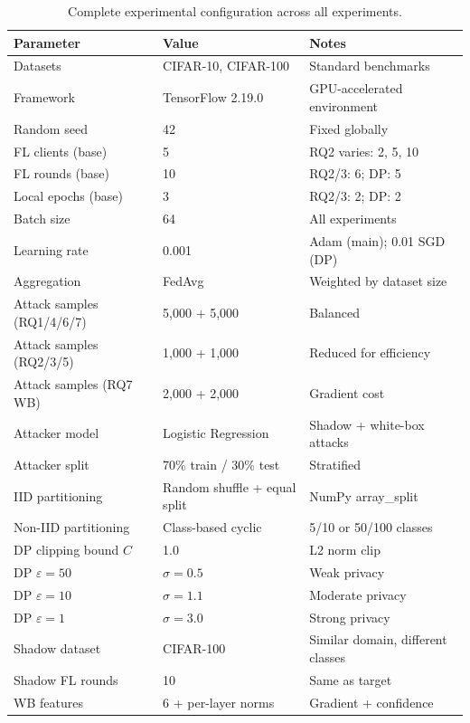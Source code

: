 \documentclass[12pt, a4paper]{report}
\begin{document}
\begin{table}[H]
  \centering
  \caption{Complete experimental configuration across all experiments.}
  \label{tab:config}
  \begin{tabular}{llp{5cm}}
    \toprule
    \textbf{Parameter} & \textbf{Value} & \textbf{Notes} \\
    \midrule
    Datasets                  & CIFAR-10, CIFAR-100   & Standard benchmarks \\
    Framework                 & TensorFlow 2.19.0     & GPU-accelerated environment \\
    Random seed               & 42                    & Fixed globally \\
    FL clients (base)         & 5                     & RQ2 varies: 2, 5, 10 \\
    FL rounds (base)          & 10                    & RQ2/3: 6; DP: 5 \\
    Local epochs (base)       & 3                     & RQ2/3: 2; DP: 2 \\
    Batch size                & 64                    & All experiments \\
    Learning rate             & 0.001                 & Adam (main); 0.01 SGD (DP) \\
    Aggregation               & FedAvg                & Weighted by dataset size \\
    Attack samples (RQ1/4/6/7) & 5,000 + 5,000        & Balanced \\
    Attack samples (RQ2/3/5)  & 1,000 + 1,000         & Reduced for efficiency \\
    Attack samples (RQ7 WB)   & 2,000 + 2,000         & Gradient cost \\
    Attacker model            & Logistic Regression   & Shadow + white-box attacks \\
    Attacker split            & 70\% train / 30\% test & Stratified \\
    IID partitioning          & Random shuffle + equal split & NumPy array\_split \\
    Non-IID partitioning      & Class-based cyclic    & 5/10 or 50/100 classes \\
    DP clipping bound $C$     & 1.0                   & L2 norm clip \\
    DP $\varepsilon=50$       & $\sigma = 0.5$        & Weak privacy \\
    DP $\varepsilon=10$       & $\sigma = 1.1$        & Moderate privacy \\
    DP $\varepsilon=1$        & $\sigma = 3.0$        & Strong privacy \\
    Shadow dataset            & CIFAR-100             & Similar domain, different classes \\
    Shadow FL rounds          & 10                    & Same as target \\
    WB features               & 6 + per-layer norms   & Gradient + confidence \\
    \bottomrule
  \end{tabular}
\end{table}
\end{document}
